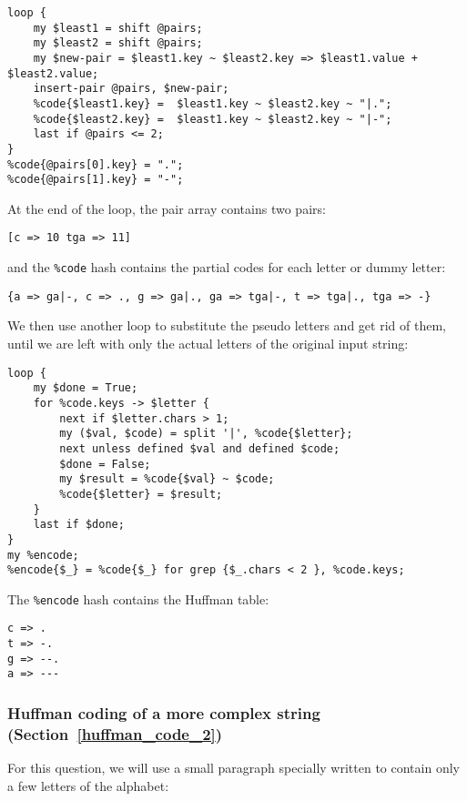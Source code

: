 {\begin{verbatim}
loop {
    my $least1 = shift @pairs;
    my $least2 = shift @pairs;
    my $new-pair = $least1.key ~ $least2.key => $least1.value + $least2.value;
    insert-pair @pairs, $new-pair;
    %code{$least1.key} =  $least1.key ~ $least2.key ~ "|.";
    %code{$least2.key} =  $least1.key ~ $least2.key ~ "|-";
    last if @pairs <= 2;
}
%code{@pairs[0].key} = ".";
%code{@pairs[1].key} = "-";
\end{verbatim}

At the end of the loop, the pair array contains two pairs:

\begin{verbatim}
[c => 10 tga => 11]
\end{verbatim}

and the \verb'%code' hash contains the partial codes for each 
letter or dummy letter:

\begin{verbatim}
{a => ga|-, c => ., g => ga|., ga => tga|-, t => tga|., tga => -}
\end{verbatim}

We then use another loop to substitute the pseudo letters and get 
rid of them, until we are left with only the actual letters of the 
original input string:

\begin{verbatim}
loop {   
    my $done = True;
    for %code.keys -> $letter {
        next if $letter.chars > 1;
        my ($val, $code) = split '|', %code{$letter};
        next unless defined $val and defined $code;
        $done = False;
        my $result = %code{$val} ~ $code;
        %code{$letter} = $result;
    }
    last if $done;
}
my %encode;
%encode{$_} = %code{$_} for grep {$_.chars < 2 }, %code.keys;
\end{verbatim}

The \verb'%encode' hash contains the Huffman table:

\begin{verbatim}
c => .
t => -.
g => --.
a => ---
\end{verbatim}

\subsubsection{Huffman coding of a more complex string (Section~\ref{huffman_code_2})}

For this question, we will use a small paragraph specially written 
to contain only a few letters of the alphabet:

}
